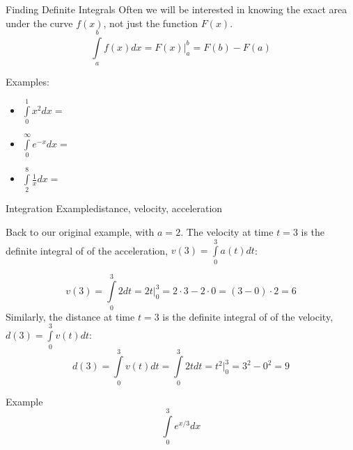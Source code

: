 \documentclass{beamer}
\begin{document}
\begin{frame}{Finding Definite Integrals}
Often we will be interested in knowing the exact area under the curve $f(x)$, not just the function $F(x)$.
\[
\int\limits_a^bf(x)dx=F(x)|_a^b=F(b)-F(a)
\]



Examples:
\begin{itemize}
\item$ \int\limits_{0}^1x^2dx=$%
\vspace{2mm}
\item$ \int\limits_{0}^{\infty}e^{-x}dx=$%
\vspace{2mm}
\item$ \int\limits_{2}^{8}\frac{1}{x}dx=$%
\end{itemize}

\end{frame}

\begin{frame}{Integration Example}{distance, velocity, acceleration}

Back to our original example, with $a=2$.  The velocity at time $t=3$ is the definite integral of of the acceleration, $v(3)=\int\limits_0^{3} a(t)dt$:

\[
v(3)=\int\limits_0^{3}  2 dt=2t|_0^3=2\cdot 3-2\cdot 0=(3-0)\cdot 2=6
\]
\pause
Similarly, the distance at time $t=3$ is the definite integral of of the velocity, $d(3)=\int\limits_0^{3} v(t)dt$:
\[
d(3)=\int\limits_0^{3} v(t)dt=\int\limits_0^{3} 2tdt=t^2|_0^{3}=3^2-0^2=9
\]

\end{frame}


\begin{frame}{Example}
\[
\int\limits_0^3 e^{x/3}dx %
\]
\vspace{60mm}

\end{frame}
\end{document}
